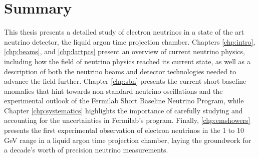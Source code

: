 \chapter{Summary}

This thesis presents a detailed study of electron neutrinos in a state of the art neutrino detector, the liquid argon time projection chamber.  Chapters \ref{chp:intro}, \ref{chp:beams}, and \ref{chp:lartpcs} present an overview of current neutrino physics, including how the field of neutrino physics reached its current state, as well as a description of both the neutrino beams and detector technologies needed to advance the field further.  Chapter \ref{chp:sbn} presents the current short baseline anomalies that hint towards non standard neutrino oscillations and the experimental outlook of the Fermilab Short Baseline Neutrino Program, while Chapter \ref{chp:systematics} highlights the importance of carefully studying and accounting for the uncertainties in Fermilab's program.  Finally, \ref{chp:emshowers} presents the first experimental observation of electron neutrinos in the 1 to 10 GeV range in a liquid argon time projection chamber, laying the groundwork for a decade's worth of precision neutrino measurements.